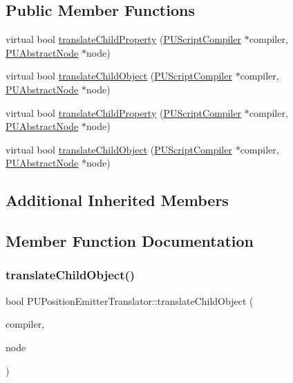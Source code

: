 \subsection*{Public Member Functions}
\begin{DoxyCompactItemize}
\item 
virtual bool \hyperlink{classPUPositionEmitterTranslator_afe3c5bb3628a9387b52d9813f088e05f}{translate\+Child\+Property} (\hyperlink{classPUScriptCompiler}{P\+U\+Script\+Compiler} $\ast$compiler, \hyperlink{classPUAbstractNode}{P\+U\+Abstract\+Node} $\ast$node)
\item 
virtual bool \hyperlink{classPUPositionEmitterTranslator_afc5492ebf960e467a9fc7cdc88b5ff72}{translate\+Child\+Object} (\hyperlink{classPUScriptCompiler}{P\+U\+Script\+Compiler} $\ast$compiler, \hyperlink{classPUAbstractNode}{P\+U\+Abstract\+Node} $\ast$node)
\item 
virtual bool \hyperlink{classPUPositionEmitterTranslator_a62671a705fc0ba5288b5dc37512d216e}{translate\+Child\+Property} (\hyperlink{classPUScriptCompiler}{P\+U\+Script\+Compiler} $\ast$compiler, \hyperlink{classPUAbstractNode}{P\+U\+Abstract\+Node} $\ast$node)
\item 
virtual bool \hyperlink{classPUPositionEmitterTranslator_a07a82748049af56c21687a07204988cf}{translate\+Child\+Object} (\hyperlink{classPUScriptCompiler}{P\+U\+Script\+Compiler} $\ast$compiler, \hyperlink{classPUAbstractNode}{P\+U\+Abstract\+Node} $\ast$node)
\end{DoxyCompactItemize}
\subsection*{Additional Inherited Members}


\subsection{Member Function Documentation}
\mbox{\label{classPUPositionEmitterTranslator_afc5492ebf960e467a9fc7cdc88b5ff72}} 
\subsubsection{\texorpdfstring{translate\+Child\+Object()}{translateChildObject()}\hspace{0.1cm}{\footnotesize\ttfamily [1/2]}}
{\footnotesize\ttfamily bool P\+U\+Position\+Emitter\+Translator\+::translate\+Child\+Object (\begin{DoxyParamCaption}\item[{\hyperlink{classPUScriptCompiler}{P\+U\+Script\+Compiler} $\ast$}]{compiler,  }\item[{\hyperlink{classPUAbstractNode}{P\+U\+Abstract\+Node} $\ast$}]{node }\end{DoxyParamCaption})\hspace{0.3cm}{\ttfamily [virtual]}}


